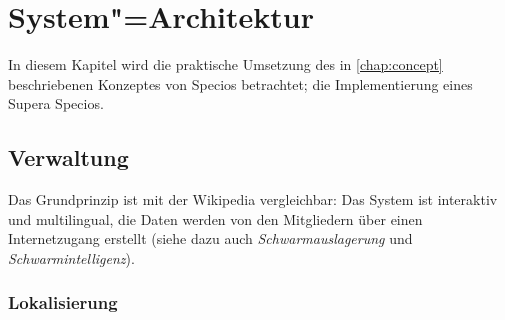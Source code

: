 \chapter{System"=Architektur}\label{chap:architecture}

In diesem Kapitel wird die praktische Umsetzung des in \vref{chap:concept} beschriebenen Konzeptes von Specios betrachtet; die Implementierung eines Supera Specios.

\section{Verwaltung}\label{sec:maintenance}

Das Grundprinzip ist mit der Wikipedia vergleichbar: Das System ist interaktiv und multilingual, die Daten werden von den Mitgliedern über einen Internetzugang erstellt (siehe dazu auch \textit{Schwarmauslagerung} und \textit{Schwarmintelligenz}).

\subsection{Lokalisierung}\label{sec:maintenance/localization}

